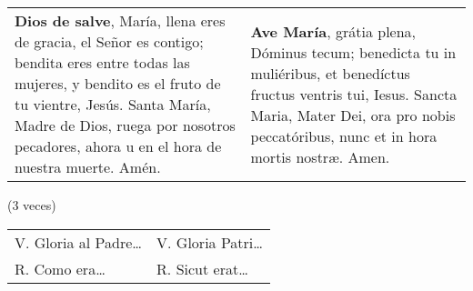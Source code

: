 \documentclass[./rosary.tex]{subfiles}
\begin{document}
\label{sec:hailMary}
\begin{longtable} { p{} p{} }
    \textbf{Dios de salve}, María, llena eres de gracia, el Señor es contigo; bendita eres entre todas las mujeres,
    y bendito es el fruto de tu vientre, Jesús. Santa María, Madre de Dios, ruega por nosotros pecadores,
    ahora u en el hora de nuestra muerte. Amén.

     &

    \textbf{Ave María}, grátia plena, Dóminus tecum; benedicta tu in muliéribus, et benedíctus fructus ventris tui,
    Iesus. Sancta Maria, Mater Dei, ora pro nobis peccatóribus, nunc et in hora mortis nostræ. Amen.
\end{longtable}

\begin{flushright}
    (3 veces)
\end{flushright}


\begin{longtable} { p{} p{} }
    V. Gloria al Padre{\ldots} & V. Gloria Patri{\ldots} \\
    R. Como era{\ldots}        & R. Sicut erat{\ldots}   \\
\end{longtable}
\end{document}

